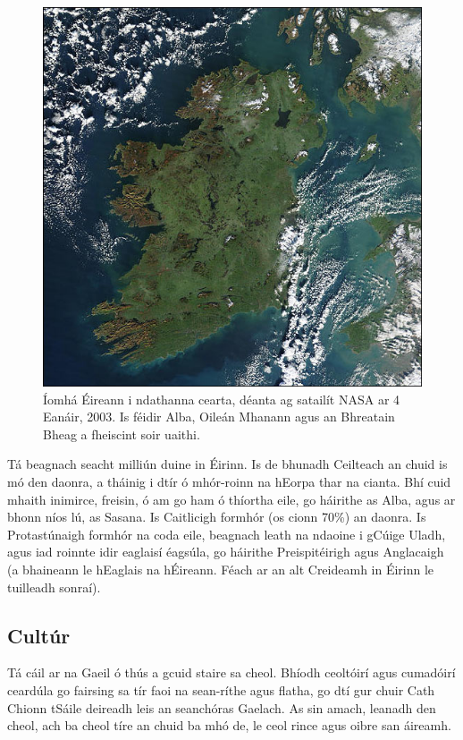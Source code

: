 \documentclass[a4paper,12pt]{article}
\theoremstyle{plain} %
\theoremstyle{definition} %
\theoremstyle{remark} %
\begin{document}
\begin{figure}
\includegraphics[width=\linewidth]{Ireland_NASA.jpg}
\caption{Íomhá Éireann i ndathanna cearta, déanta ag satailít NASA ar 4 Eanáir, 2003. Is féidir Alba, Oileán Mhanann agus an Bhreatain Bheag a fheiscint soir uaithi.}
\end{figure}Tá beagnach seacht milliún duine in Éirinn. Is de bhunadh Ceilteach an chuid is mó den daonra, a tháinig i dtír ó mhór-roinn na hEorpa thar na cianta. Bhí cuid mhaith inimirce, freisin, ó am go ham ó thíortha eile, go háirithe as Alba, agus ar bhonn níos lú, as Sasana. Is Caitlicigh formhór (os cionn 70\%) an daonra. Is Protastúnaigh formhór na coda eile, beagnach leath na ndaoine i gCúige Uladh, agus iad roinnte idir eaglaisí éagsúla, go háirithe Preispitéirigh agus Anglacaigh (a bhaineann le hEaglais na hÉireann. Féach ar an alt Creideamh in Éirinn le tuilleadh sonraí).

\subsection{Cultúr}

Tá cáil ar na Gaeil ó thús a gcuid staire sa cheol. Bhíodh ceoltóirí agus cumadóirí ceardúla go fairsing sa tír faoi na sean-ríthe agus flatha, go dtí gur chuir Cath Chionn tSáile deireadh leis an seanchóras Gaelach. As sin amach, leanadh den cheol, ach ba cheol tíre an chuid ba mhó de, le ceol rince agus oibre san áireamh.
\end{document}
